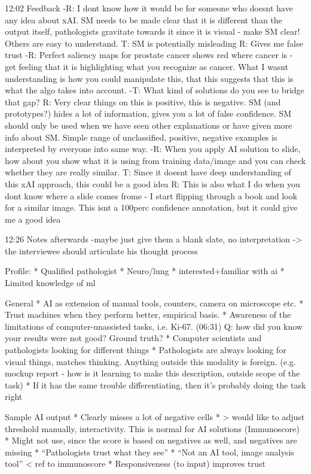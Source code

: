 12:02 Feedback
-R: I dont know how it would be for someone who doesnt have any idea about xAI. SM needs to be made clear that it is different than the output itself, pathologists gravitate towards it since it is visual - make SM clear! Others are easy to understand. T: SM is potentially misleading R: Gives me false trust
-R: Perfect saliency maps for prostate cancer shows red where cancer is - get feeling that it is highlighting what you recognize as cancer. What I wasnt understanding is how you could manipulate this, that this suggests that this is what the algo takes into account.
-T: What kind of solutions do you see to bridge that gap? R: Very clear things on this is positive, this is negative. SM (and prototypes?) hides a lot of information, gives you a lot of false confidence. SM should only be used when we have seen other explanations or have given more info about SM. Simple range of unclassified, positive, negative examples is interpreted by everyone into same way.
-R: When you apply AI solution to slide, how about you show what it is using from training data/image and you can check whether they are really similar. T: Since it doesnt have deep understanding of this xAI approach, this could be a good idea R: This is also what I do when you dont know where a slide comes frome - I start flipping through a book and look for a similar image. This isnt a 100perc confidence annotation, but it could give me a good idea

12:26 Notes afterwards
-maybe just give them a blank slate, no interpretation -> the interviewee should articulate his thought process

Profile:
* Qualified pathologist
* Neuro/lung
* interested+familiar with ai
* Limited knowledge of ml

General
* AI as extension of manual tools, counters, camera on microscope etc.
* Trust machines when they perform better, empirical basis.
* Awareness of the limitations of computer-unassisted tasks, i.e. Ki-67. (06:31) Q: how did you know your results were not good? Ground truth?
* Computer scientists and pathologists looking for different things
* Pathologists are always looking for visual things, matches thinking. Anything outside this modality is foreign. (e.g. mockup report - how is it learning to make this description, outside scope of the task)
* If it has the same trouble differentiating, then it’s probably doing the task right

Sample AI output
* Clearly misses a lot of negative cells
* > would like to adjust threshold manually, interactivity. This is normal for AI solutions (Immunoscore)
* Might not use, since the score is based on negatives as well, and negatives are missing
* “Pathologists trust what they see”
* “Not an AI tool, image analysis tool” < ref to immunoscore
* Responsiveness (to input) improves trust

